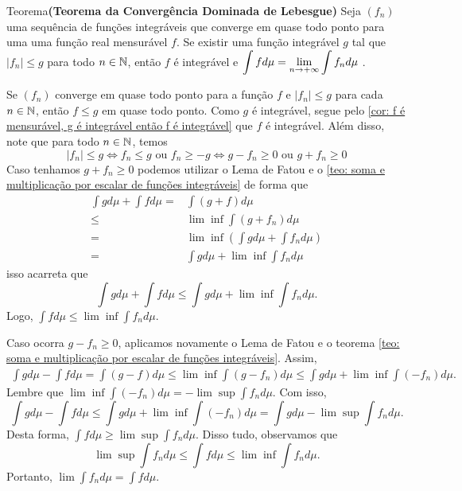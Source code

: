 \begin{env}{Teorema}\textbf{(Teorema da Convergência Dominada de Lebesgue)}
	Seja $(f_n)$ uma sequência de funções integráveis que converge em quase todo ponto para uma uma função real mensurável $f$.
	Se existir uma função integrável $g$ tal que $|f_n| \leq g$ para todo $n \in \operatorname{\mathbb{N}}$, então $f$ é integrável e $\displaystyle \int f d\mu = \displaystyle \lim_{n \to +\infty} \int f_n d\mu$ \cite{bartle}.
\end{env}

\begin{prova}
	Se $(f_n)$ converge em quase todo ponto para a função $f$ e $|f_n| \leq g$ para cada $n \in \operatorname{\mathbb{N}}$, então $f \leq g$ em quase todo ponto.
	Como $g$ é integrável, segue pelo \ref{cor: f é mensurável, g é integrável então f é integrável} que $f$ é integrável.
	Além disso, note que para todo $n \in \operatorname{\mathbb{N}}$, temos
	$$
	|f_n| \leq g 
	\Leftrightarrow 
	f_n \leq g 
	\textrm{\ ou \ }
	 f_n \geq -g
	\Leftrightarrow
	g - f_n \geq 0
	\textrm{\ ou \ }
	g + f_n \geq 0
	$$
	Caso tenhamos $g + f_n \geq 0$ podemos utilizar o Lema de Fatou e o \ref{teo: soma e multiplicação por escalar de funções integráveis} de forma que 
	\begin{align*}
		\int g d\mu + \int f d\mu =& \int (g + f) d\mu \\
		\leq & \lim \inf \int (g + f_n) d\mu \\
		=& \lim \inf \left(\int g d\mu + \int f_n d\mu\right)\\
		=& \int g d\mu + \lim \inf \int f_n d\mu
	\end{align*}
	isso acarreta que 
	$$
	\int g d\mu + \int f d\mu \leq  \int g d\mu + \lim \inf \int f_n d\mu.
	$$
	Logo, $\displaystyle \int f d\mu \leq \lim \inf \int f_n d\mu$.
	
	Caso ocorra $g - f_n \geq 0$, aplicamos novamente o Lema de Fatou e o teorema \ref{teo: soma e multiplicação por escalar de funções integráveis}.
	Assim, 
	\begin{align*}
		\int g d\mu - \int f d\mu = \int (g - f) d\mu
		\leq  \lim \inf \int (g - f_n) d\mu
		\leq \int g d\mu + \lim \inf \int (- f_n) d\mu.
	\end{align*}
	Lembre que $\displaystyle \lim \inf \int (- f_n) d\mu = - \lim \sup \int f_n d\mu$.
	Com isso, 
	$$
	\int g d\mu - \int f d\mu \leq 
	\int g d\mu + \lim \inf \int (- f_n) d\mu
	=
	\int g d\mu - \lim \sup \int f_n d\mu.
	$$
	Desta forma, $\displaystyle \int f d\mu \geq \lim \sup \int f_n d\mu$.
	Disso tudo, observamos que 
	$$
	\lim \sup \int f_n d\mu \leq  \int f d\mu \leq \lim \inf \int f_n d\mu. 
	$$
	Portanto, $\displaystyle \lim \int f_n d\mu =  \int f d\mu $.
\end{prova}























